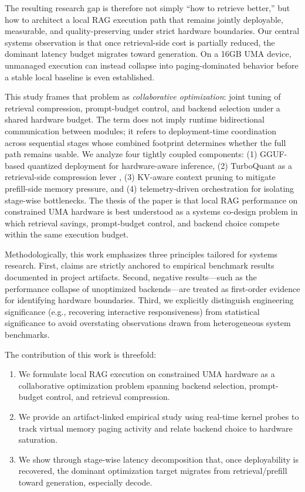 \documentclass[10pt,twocolumn]{article}
\begin{document}
The resulting research gap is therefore not simply ``how to retrieve better,'' but how to architect a local RAG execution path that remains jointly deployable, measurable, and quality-preserving under strict hardware boundaries. Our central systems observation is that once retrieval-side cost is partially reduced, the dominant latency budget migrates toward generation. On a 16GB UMA device, unmanaged execution can instead collapse into paging-dominated behavior before a stable local baseline is even established.

This study frames that problem as \emph{collaborative optimization}: joint tuning of retrieval compression, prompt-budget control, and backend selection under a shared hardware budget. The term does not imply runtime bidirectional communication between modules; it refers to deployment-time coordination across sequential stages whose combined footprint determines whether the full path remains usable. We analyze four tightly coupled components: (1) GGUF-based quantized deployment for hardware-aware inference, (2) TurboQuant as a retrieval-side compression lever \cite{zandieh2025turboquant}, (3) KV-aware context pruning to mitigate prefill-side memory pressure, and (4) telemetry-driven orchestration for isolating stage-wise bottlenecks. The thesis of the paper is that local RAG performance on constrained UMA hardware is best understood as a systems co-design problem in which retrieval savings, prompt-budget control, and backend choice compete within the same execution budget.

Methodologically, this work emphasizes three principles tailored for systems research. First, claims are strictly anchored to empirical benchmark results documented in project artifacts. Second, negative results—such as the performance collapse of unoptimized backends—are treated as first-order evidence for identifying hardware boundaries. Third, we explicitly distinguish engineering significance (e.g., recovering interactive responsiveness) from statistical significance to avoid overstating observations drawn from heterogeneous system benchmarks.

The contribution of this work is threefold:
\begin{enumerate}[leftmargin=1.5em, itemsep=0pt]
    \item We formulate local RAG execution on constrained UMA hardware as a collaborative optimization problem spanning backend selection, prompt-budget control, and retrieval compression.
    \item We provide an artifact-linked empirical study using real-time kernel probes to track virtual memory paging activity and relate backend choice to hardware saturation.
    \item We show through stage-wise latency decomposition that, once deployability is recovered, the dominant optimization target migrates from retrieval/prefill toward generation, especially decode.
\end{enumerate}
\end{document}
